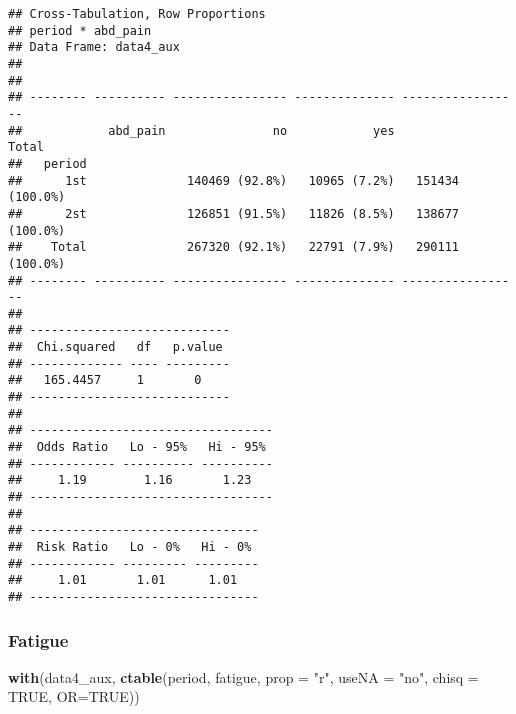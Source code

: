 \documentclass[
]{article}
\newenvironment{Shaded}{\begin{snugshade}}{\end{snugshade}}
\newcommand{\DataTypeTok}[1]{\textcolor[rgb]{0.13,0.29,0.53}{#1}}
\newcommand{\KeywordTok}[1]{\textcolor[rgb]{0.13,0.29,0.53}{\textbf{#1}}}
\newcommand{\NormalTok}[1]{#1}
\newcommand{\OtherTok}[1]{\textcolor[rgb]{0.56,0.35,0.01}{#1}}
\newcommand{\StringTok}[1]{\textcolor[rgb]{0.31,0.60,0.02}{#1}}
\begin{document}
\begin{verbatim}
## Cross-Tabulation, Row Proportions  
## period * abd_pain  
## Data Frame: data4_aux  
## 
## 
## -------- ---------- ---------------- -------------- -----------------
##            abd_pain               no            yes             Total
##   period                                                             
##      1st              140469 (92.8%)   10965 (7.2%)   151434 (100.0%)
##      2st              126851 (91.5%)   11826 (8.5%)   138677 (100.0%)
##    Total              267320 (92.1%)   22791 (7.9%)   290111 (100.0%)
## -------- ---------- ---------------- -------------- -----------------
## 
## ----------------------------
##  Chi.squared   df   p.value 
## ------------- ---- ---------
##   165.4457     1       0    
## ----------------------------
## 
## ----------------------------------
##  Odds Ratio   Lo - 95%   Hi - 95% 
## ------------ ---------- ----------
##     1.19        1.16       1.23   
## ----------------------------------
## 
## --------------------------------
##  Risk Ratio   Lo - 0%   Hi - 0% 
## ------------ --------- ---------
##     1.01       1.01      1.01   
## --------------------------------
\end{verbatim}

\hypertarget{fatigue-1}{%
\subsubsection{Fatigue}\label{fatigue-1}}

\begin{Shaded}
\begin{Highlighting}[]
\KeywordTok{with}\NormalTok{(data4_aux, }\KeywordTok{ctable}\NormalTok{(period, fatigue, }\DataTypeTok{prop =} \StringTok{"r"}\NormalTok{, }\DataTypeTok{useNA =} \StringTok{"no"}\NormalTok{, }\DataTypeTok{chisq =} \OtherTok{TRUE}\NormalTok{, }\DataTypeTok{OR=}\OtherTok{TRUE}\NormalTok{))}
\end{Highlighting}
\end{Shaded}
\end{document}
